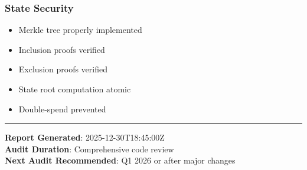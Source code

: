 \documentclass[
]{article}
\providecommand{\tightlist}{%
  \setlength{\itemsep}{0pt}\setlength{\parskip}{0pt}}
\begin{document}
\subsubsection{State Security}\label{state-security}

\begin{itemize}
\tightlist
\item[$\square$]
  Merkle tree properly implemented
\item[$\square$]
  Inclusion proofs verified
\item[$\square$]
  Exclusion proofs verified
\item[$\square$]
  State root computation atomic
\item[$\square$]
  Double-spend prevented
\end{itemize}

\begin{center}\rule{0.5\linewidth}{0.5pt}\end{center}

\textbf{Report Generated}: 2025-12-30T18:45:00Z\\
\textbf{Audit Duration}: Comprehensive code review\\
\textbf{Next Audit Recommended}: Q1 2026 or after major changes
\end{document}
